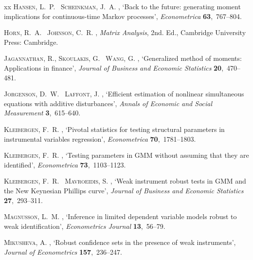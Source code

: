 \documentclass[hidelinks, 11 pt, a4paper, pdflatex]{article}
\begin{document}
{\begin{thebibliography}{xx}
 \textsc{Hansen, L.~P. \harvardand\ Scheinkman, J.~A.}  \harvardyearright ,
  `Back to the future: generating moment implications for continuous-time Markov processes',
  {\em Econometrica} {\bf 63},~767--804.

 \textsc{Horn, R.~A. \harvardand\ Johnson, C.~R.}  \harvardyearright ,
  {\em Matrix Analysis}, 2nd. Ed., Cambridge University Press: Cambridge.

 \textsc{Jagannathan, R., Skoulakis, G. \harvardand\ Wang, G.}  \harvardyearright ,
  `Generalized method of moments: Applications in finance',
  {\em Journal of Business and Economic Statistics} {\bf 20},~470--481.

 \textsc{Jorgenson, D.~W. \harvardand\ Laffont, J.} \harvardyearright ,
  `Efficient estimation of nonlinear simultaneous equations with additive disturbances',
  {\em Annals of Economic and Social Measurement} {\bf 3},~615--640.

 \textsc{Kleibergen, F.~R.}  \harvardyearright ,
  `Pivotal statistics for testing structural parameters in instrumental variables regression',
  {\em Econometrica} {\bf 70},~1781--1803.

 \textsc{Kleibergen, F.~R.}  \harvardyearright ,
  `Testing parameters in GMM without assuming that they are identified',
  {\em Econometrica} {\bf 73},~1103--1123.

 \textsc{Kleibergen, F.~R. \harvardand\ Mavroeidis, S.} \harvardyearright ,
  `Weak instrument robust tests in GMM and the New Keynesian Phillips curve',
  {\em Journal of Business and Economic Statistics} {\bf 27},~293--311.

 \textsc{Magnusson, L.~M.}  \harvardyearright ,
  `Inference in limited dependent variable models robust to weak identification',
  {\em Econometrics Journal} {\bf 13},~56--79.

 \textsc{Mikusheva, A.}  \harvardyearright ,
  `Robust confidence sets in the presence of weak instruments',
  {\em Journal of Econometrics} {\bf 157},~236--247.


\end{thebibliography}}
\end{document}
